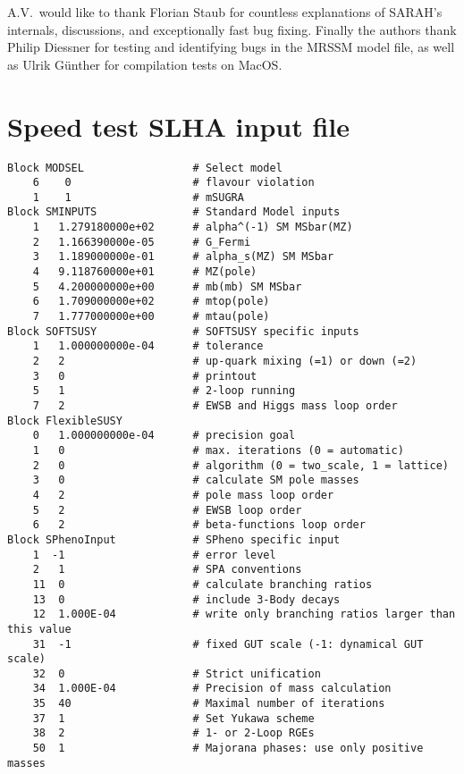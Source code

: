 \documentclass[final,3p,11pt,pdflatex]{elsarticle}
\begin{document}
A.V.\ would like to thank Florian Staub for countless explanations of
SARAH's internals, discussions, and exceptionally fast bug fixing.
Finally the authors thank Philip Diessner for testing and identifying
bugs in the MRSSM model file, as well as Ulrik Günther for compilation
tests on MacOS.

\appendix

\section{Speed test SLHA input file}
\label{sec:speed-test-slha-template-file}
%
\begin{lstlisting}
Block MODSEL                 # Select model
    6    0                   # flavour violation
    1    1                   # mSUGRA
Block SMINPUTS               # Standard Model inputs
    1   1.279180000e+02      # alpha^(-1) SM MSbar(MZ)
    2   1.166390000e-05      # G_Fermi
    3   1.189000000e-01      # alpha_s(MZ) SM MSbar
    4   9.118760000e+01      # MZ(pole)
    5   4.200000000e+00      # mb(mb) SM MSbar
    6   1.709000000e+02      # mtop(pole)
    7   1.777000000e+00      # mtau(pole)
Block SOFTSUSY               # SOFTSUSY specific inputs
    1   1.000000000e-04      # tolerance
    2   2                    # up-quark mixing (=1) or down (=2)
    3   0                    # printout
    5   1                    # 2-loop running
    7   2                    # EWSB and Higgs mass loop order
Block FlexibleSUSY
    0   1.000000000e-04      # precision goal
    1   0                    # max. iterations (0 = automatic)
    2   0                    # algorithm (0 = two_scale, 1 = lattice)
    3   0                    # calculate SM pole masses
    4   2                    # pole mass loop order
    5   2                    # EWSB loop order
    6   2                    # beta-functions loop order
Block SPhenoInput            # SPheno specific input
    1  -1                    # error level
    2   1                    # SPA conventions
    11  0                    # calculate branching ratios
    13  0                    # include 3-Body decays
    12  1.000E-04            # write only branching ratios larger than this value
    31  -1                   # fixed GUT scale (-1: dynamical GUT scale)
    32  0                    # Strict unification
    34  1.000E-04            # Precision of mass calculation
    35  40                   # Maximal number of iterations
    37  1                    # Set Yukawa scheme
    38  2                    # 1- or 2-Loop RGEs
    50  1                    # Majorana phases: use only positive masses

\end{lstlisting}
\end{document}
